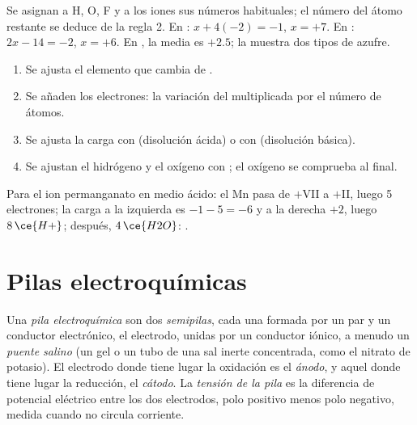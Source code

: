 \begin{method}\label{met:b1:nernst:oxidation-numbers}
Se asignan a H, O, F y a los iones sus números habituales; el número del
átomo restante se deduce de la regla 2. En : $x + 4(-2) = -1$,
$x = +7$. En : $2x - 14 = -2$, $x = +6$. En , la
media es $+2.5$; la  muestra dos tipos de azufre.
\end{method}

\begin{method}\label{met:b1:nernst:balance-by-on}
\begin{enumerate}
  \item Se ajusta el elemento que cambia de .
  \item Se añaden los electrones: la variación del 
        multiplicada por el número de átomos.
  \item Se ajusta la carga con  (disolución ácida) o con 
        (disolución básica).
  \item Se ajustan el hidrógeno y el oxígeno con ; el oxígeno se
        comprueba al final.
\end{enumerate}
Para el ion permanganato en medio ácido: el Mn pasa de $+$VII a $+$II,
luego 5 electrones; la carga a la izquierda es $-1 - 5 = -6$ y a la
derecha $+2$, luego $8\,\ce{H+}$; después, $4\,\ce{H2O}$:
.
\end{method}

\section{Pilas electroquímicas}

\begin{definition}\label{def:b1:nernst:cell}
Una \emph{pila electroquímica} son dos
\emph{semipilas}, cada una formada por un par y un
conductor electrónico, el electrodo, unidas por un conductor iónico, a
menudo un \emph{puente salino} (un gel o un tubo de
una sal inerte concentrada, como el nitrato de potasio). El electrodo
donde tiene lugar la oxidación es el \emph{ánodo}, y
aquel donde tiene lugar la reducción, el \emph{cátodo}.
La \emph{tensión de la pila} es la diferencia de
potencial eléctrico entre los dos electrodos, polo positivo menos polo
negativo, medida cuando no circula corriente.
\end{definition}

